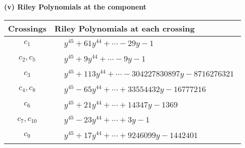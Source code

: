 \documentclass[1p]{elsarticle_modified}
\theoremstyle{definition}
\begin{document}
\newpage\renewcommand{\arraystretch}{1}
\flushleft \textbf{(v) Riley Polynomials at the component}\newline \\
\begin{tabular}{m{50pt}|m{274pt}}
Crossings & \hspace{64pt}Riley Polynomials at each crossing \\
\hline $$\begin{aligned}c_{1}\end{aligned}$$&$\begin{aligned}
&y^{45}+61 y^{44}+\cdots-29 y-1
\end{aligned}$\\
\hline $$\begin{aligned}c_{2},c_{5}\end{aligned}$$&$\begin{aligned}
&y^{45}+9 y^{44}+\cdots-9 y-1
\end{aligned}$\\
\hline $$\begin{aligned}c_{3}\end{aligned}$$&$\begin{aligned}
&y^{45}+113 y^{44}+\cdots-304227830897 y-8716276321
\end{aligned}$\\
\hline $$\begin{aligned}c_{4},c_{8}\end{aligned}$$&$\begin{aligned}
&y^{45}-65 y^{44}+\cdots+33554432 y-16777216
\end{aligned}$\\
\hline $$\begin{aligned}c_{6}\end{aligned}$$&$\begin{aligned}
&y^{45}+21 y^{44}+\cdots+14347 y-1369
\end{aligned}$\\
\hline $$\begin{aligned}c_{7},c_{10}\end{aligned}$$&$\begin{aligned}
&y^{45}-23 y^{44}+\cdots+3 y-1
\end{aligned}$\\
\hline $$\begin{aligned}c_{9}\end{aligned}$$&$\begin{aligned}
&y^{45}+17 y^{44}+\cdots+9246099 y-1442401
\end{aligned}$\\

\end{tabular}
\end{document}
